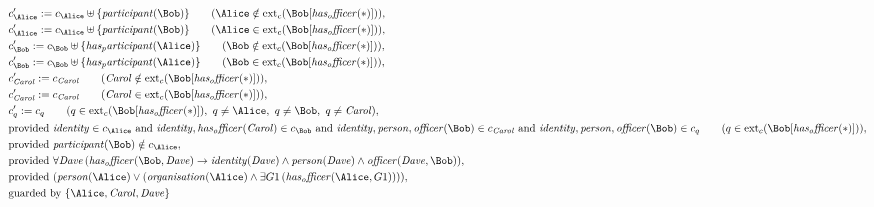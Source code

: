 \begin{align*}
&
c'_
{
\Alice
}
 := 
c_
{
\Alice
}
 \uplus 
\{
\mathit{
participant
}
(
\Bob
)
\}
 \qquad (
\Alice
 \notin 
\mathrm{ext}_c(
\Bob
[
\mathit{
has_officer
}
(
\ast
)
]
)
)
,\\
&
c'_
{
\Alice
}
 := 
c_
{
\Alice
}
 \uplus 
\{
\mathit{
participant
}
(
\Bob
)
\}
 \qquad (
\Alice
 \in 
\mathrm{ext}_c(
\Bob
[
\mathit{
has_officer
}
(
\ast
)
]
)
)
,\\
&
c'_
{
\Bob
}
 := 
c_
{
\Bob
}
 \uplus 
\{
\mathit{
has_participant
}
(
\Alice
)
\}
 \qquad (
\Bob
 \notin 
\mathrm{ext}_c(
\Bob
[
\mathit{
has_officer
}
(
\ast
)
]
)
)
,\\
&
c'_
{
\Bob
}
 := 
c_
{
\Bob
}
 \uplus 
\{
\mathit{
has_participant
}
(
\Alice
)
\}
 \qquad (
\Bob
 \in 
\mathrm{ext}_c(
\Bob
[
\mathit{
has_officer
}
(
\ast
)
]
)
)
,\\
&
c'_
{
\mathit{Carol}
}
 := 
c_
{
\mathit{Carol}
}
 \qquad (
\mathit{Carol}
 \notin 
\mathrm{ext}_c(
\Bob
[
\mathit{
has_officer
}
(
\ast
)
]
)
)
,\\
&
c'_
{
\mathit{Carol}
}
 := 
c_
{
\mathit{Carol}
}
 \qquad (
\mathit{Carol}
 \in 
\mathrm{ext}_c(
\Bob
[
\mathit{
has_officer
}
(
\ast
)
]
)
)
,\\
&
c'_
q
 := 
c_
q
 \qquad (
q
 \in 
\mathrm{ext}_c(
\Bob
[
\mathit{
has_officer
}
(
\ast
)
]
)
,\ 
q \neq 
\Alice
,\ 
q \neq 
\Bob
,\ 
q \neq 
\mathit{Carol}
)
,\\
&
\text{provided } 
\mathit{
identity
}
 \in c_
{
\Alice
}
 \text{ and } 
\mathit{
identity
}
,
\mathit{
has_officer
}
(
\mathit{Carol}
)
 \in c_
{
\Bob
}
 \text{ and } 
\mathit{
identity
}
,
\mathit{
person
}
,
\mathit{
officer
}
(
\Bob
)
 \in c_
{
\mathit{Carol}
}
 \text{ and } 
\mathit{
identity
}
,
\mathit{
person
}
,
\mathit{
officer
}
(
\Bob
)
 \in c_
q
 \qquad (
q \in 
\mathrm{ext}_c(
\Bob
[
\mathit{
has_officer
}
(
\ast
)
]
)
)
,\\
&
\text{provided } 
\mathit{
participant
}
(
\Bob
)
 \notin c_
{
\Alice
}
,\\
&
\text{provided } 
\forall 
\mathit{Dave}
\,(
\mathit{
has_officer
}
(
\Bob
,
\mathit{Dave}
)
\rightarrow
\mathit{
identity
}
(
\mathit{Dave}
)
\land
\mathit{
person
}
(
\mathit{Dave}
)
\land
\mathit{
officer
}
(
\mathit{Dave}
,
\Bob
)
)
,\\
&
\text{provided } 
(
\mathit{
person
}
(
\Alice
)
\lor
(
\mathit{
organisation
}
(
\Alice
)
\land
\exists 
G1
\,(
\mathit{
has_officer
}
(
\Alice
,
G1
)
)
)
)
,\\
&
\text{guarded by } \{
\Alice
,
\mathit{Carol}
,
\mathit{Dave}
\}
\end{align*}
